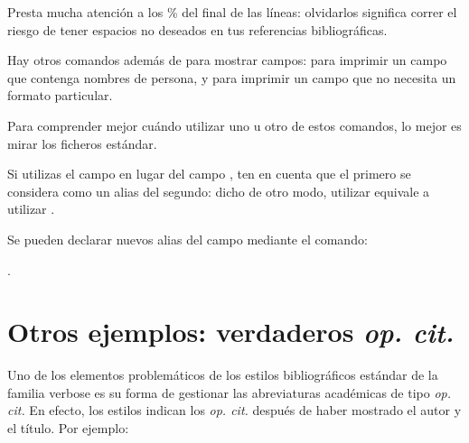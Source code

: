 \begin{latexcode}
\end{latexcode}




Presta mucha atención a los \% del final de las líneas: olvidarlos significa correr el riesgo de tener espacios no deseados en tus referencias bibliográficas.



\begin{plusloins}
	
Hay otros comandos además de  para mostrar campos:  para imprimir un campo que contenga nombres de persona, y  para imprimir un campo que no necesita un formato particular.

Para comprender mejor cuándo utilizar uno u otro de estos comandos, lo mejor es mirar los ficheros estándar.

\end{plusloins}
\begin{plusloins}
Si utilizas el campo  en lugar del campo , ten en cuenta que el primero se considera como un alias del segundo: dicho de otro modo, utilizar  equivale a utilizar .

Se pueden declarar nuevos alias del campo mediante el comando:

 .
\end{plusloins}

\section{Otros ejemplos: verdaderos \emph{op. cit.}}

Uno de los elementos problemáticos de los estilos bibliográficos estándar de la familia verbose es su forma de gestionar las abreviaturas académicas de tipo \emph{op. cit.} En efecto, los estilos indican los \emph{op. cit.} después de haber mostrado el autor y el título. Por ejemplo:

\begin{quotation}
\bibverbose	
\cite{Urner1952}

\cite{Saxer1980}
\bibverbosetrad

\cite{Urner1952}

\cite{Saxer1980}
\end{quotation}

